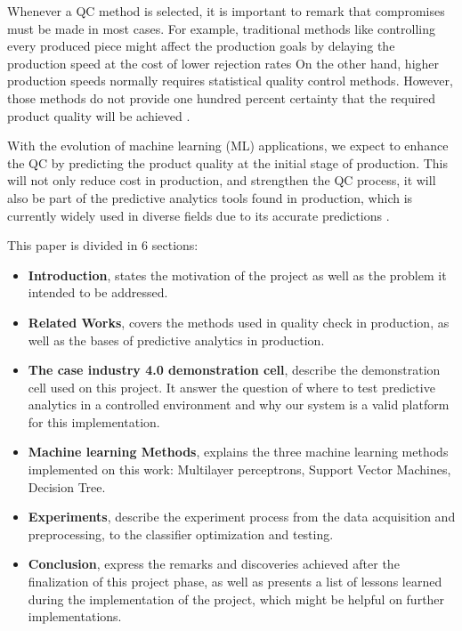 \documentclass[5p,times,procedia]{elsarticle}
\begin{document}
Whenever a QC method is selected, it is important to remark that compromises must be made in most cases. For example, traditional methods like controlling every produced piece might affect the production goals by delaying the production speed at the cost of lower rejection rates On the other hand, higher production speeds normally requires statistical quality control methods. However, those methods do not provide one hundred percent certainty that the required product quality will be achieved \cite{selvamuthu2018introduction, kurniati2015quality}.

With the evolution of machine learning (ML) applications, we expect to enhance the QC by predicting the product quality at the initial stage of production. This will not only reduce cost in production, and strengthen the QC process, it will also be part of the predictive analytics tools found in production, which is currently widely used in diverse fields due to its accurate predictions \cite{bishop2006pattern, krauss2019machine}.

This paper is divided in 6 sections:

\begin{itemize}
       \item \textbf{Introduction}, states the motivation of the project as well as the problem it intended to be addressed.
       \item \textbf{Related Works}, covers the methods used in quality check in production, as well as the bases of predictive analytics in production.
       \item \textbf{The case industry 4.0 demonstration cell}, describe the demonstration cell used on this project. It answer the question of where to test predictive analytics in a controlled environment and why our system is a valid platform for this implementation.
       \item \textbf{Machine learning Methods}, explains the three machine learning methods implemented on this work: Multilayer perceptrons, Support Vector Machines, Decision Tree.
       \item \textbf{Experiments}, describe the experiment process from the data acquisition and preprocessing, to the classifier optimization and testing.
       \item \textbf{Conclusion}, express the remarks and discoveries achieved after the finalization of this project phase, as well as presents a list of lessons learned during the implementation of the project, which might be helpful on further implementations.
\end{itemize}
\end{document}
